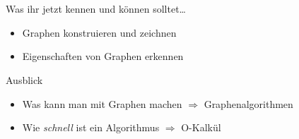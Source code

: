 \section{}
	\begin{frame}{Was ihr jetzt kennen und können solltet\dots}
			\begin{itemize}
				\item Graphen konstruieren und zeichnen
				\item Eigenschaften von Graphen erkennen
			\end{itemize}
	
	\end{frame}
	\begin{frame}{Ausblick}
		\begin{itemize}
			\item Was kann man mit Graphen machen $\Rightarrow$ Graphenalgorithmen
			\item Wie \emph{schnell} ist ein Algorithmus $\Rightarrow$ O-Kalkül 
		\end{itemize}
	\end{frame}
\section{}
\questionframe
\lastframe
{}
